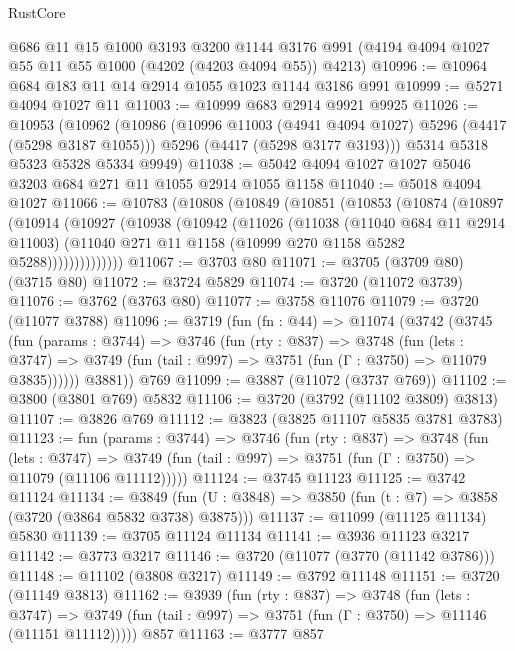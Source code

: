 \begin{lexlean}{RustCore}
\begin{coremodule}
    @686
    @11
    @15
    @1000
    @3193
    @3200
    @1144
    @3176
    @991
    (@4194 @4094 @1027 @55 @11 @55 @1000 (@4202 (@4203 @4094 @55)) @4213)
@10996 := @10964 @684 @183 @11 @14 @2914 @1055 @1023 @1144 @3186 @991
@10999 := @5271 @4094 @1027 @11
@11003 := @10999 @683 @2914 @9921 @9925
@11026 := @10953
    (@10962
      (@10986
        (@10996 @11003 (@4941 @4094 @1027) @5296 (@4417 (@5298 @3187 @1055)))
        @5296
        (@4417 (@5298 @3177 @3193)))
      @5314
      @5318
      @5323
      @5328
      @5334
      @9949)
@11038 := @5042 @4094 @1027 @1027 @5046 @3203 @684 @271 @11 @1055 @2914 @1055 @1158
@11040 := @5018 @4094 @1027
@11066 := @10783
    (@10808
      (@10849
        (@10851
          (@10853
            (@10874
              (@10897
                (@10914
                  (@10927
                    (@10938
                      (@10942
                        (@11026
                          (@11038
                            (@11040 @684 @11 @2914 @11003)
                            (@11040 @271 @11 @1158 (@10999 @270 @1158 @5282 @5288))))))))))))))
@11067 := @3703 @80
@11071 := @3705 (@3709 @80) (@3715 @80)
@11072 := @3724 @5829
@11074 := @3720 (@11072 @3739)
@11076 := @3762 (@3763 @80)
@11077 := @3758 @11076
@11079 := @3720 (@11077 @3788)
@11096 := @3719
    (fun (fn : @44) =>
    @11074
      (@3742
        (@3745
          (fun (params : @3744) =>
          @3746
            (fun (rty : @837) =>
            @3748
              (fun (lets : @3747) =>
              @3749 (fun (tail : @997) => @3751 (fun (Γ : @3750) => @11079 @3835))))))
        @3881))
    @769
@11099 := @3887 (@11072 (@3737 @769))
@11102 := @3800 (@3801 @769) @5832
@11106 := @3720 (@3792 (@11102 @3809) @3813)
@11107 := @3826 @769
@11112 := @3823 (@3825 @11107 @5835 @3781 @3783)
@11123 := fun (params : @3744) =>
  @3746
    (fun (rty : @837) =>
    @3748
      (fun (lets : @3747) =>
      @3749 (fun (tail : @997) => @3751 (fun (Γ : @3750) => @11079 (@11106 @11112)))))
@11124 := @3745 @11123
@11125 := @3742 @11124
@11134 := @3849 (fun (U : @3848) => @3850 (fun (t : @7) => @3858 (@3720 (@3864 @5832 @3738) @3875)))
@11137 := @11099 (@11125 @11134) @5830
@11139 := @3705 @11124 @11134
@11141 := @3936 @11123 @3217
@11142 := @3773 @3217
@11146 := @3720 (@11077 (@3770 (@11142 @3786)))
@11148 := @11102 (@3808 @3217)
@11149 := @3792 @11148
@11151 := @3720 (@11149 @3813)
@11162 := @3939
    (fun (rty : @837) =>
    @3748
      (fun (lets : @3747) =>
      @3749 (fun (tail : @997) => @3751 (fun (Γ : @3750) => @11146 (@11151 @11112)))))
    @857
@11163 := @3777 @857

\end{coremodule}
\end{lexlean}
